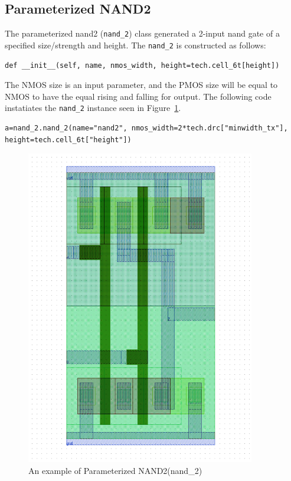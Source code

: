 \subsection{Parameterized NAND2}
\label{sec:nand2}

The parameterized nand2 (\verb|nand_2|) class generated a 2-input nand gate
of a specified size/strength and height.  The \verb|nand_2| is
constructed as follows:
\begin{verbatim}
def __init__(self, name, nmos_width, height=tech.cell_6t[height])
\end{verbatim}

The NMOS size is an input parameter, and the PMOS size
will be equal to NMOS to have the equal rising and falling for output. 
The following code instatiates the \verb|nand_2| instance seen in Figure~\ref{fig:nand2}.
\begin{verbatim}
a=nand_2.nand_2(name="nand2", nmos_width=2*tech.drc["minwidth_tx"], 
height=tech.cell_6t["height"])
\end{verbatim}

\begin{figure}[h!]
\centering
\includegraphics[width=10cm]{./figs/nand2.pdf}
\caption{An example of Parameterized NAND2(nand\_2)}
\label{fig:nand2}
\end{figure}



